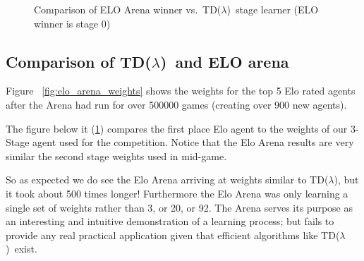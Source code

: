 \documentclass[11pt]{article}
\newcommand{\tdl}{TD($\lambda$)}
\begin{document}
\begin{figure}[htbp]
  \centering
  \caption{Comparison of ELO Arena winner vs.\ \tdl\ stage
    learner (ELO winner is stage 0)}
  \label{fig:elo_arena_comp}
\end{figure}

\clearpage

\subsection{Comparison of \tdl\ and ELO arena}
\label{sub:comparing_learning}

Figure ~\ref{fig:elo_arena_weights} shows the weights for the top 5 Elo rated agents
after the Arena had run for over 500000 games (creating over 900 new agents).

The figure below it (\ref{fig:elo_arena_comp}) compares the first place Elo agent
to the weights of our 3-Stage agent used for the competition. Notice that the 
Elo Arena results are very similar the second stage weights used in mid-game.

So as expected we do see the Elo Arena arriving at weights similar to \tdl, but
it took about 500 times longer! Furthermore the Elo Arena was only learning
a single set of weights rather than 3, or 20, or 92.
The Arena serves its purpose as an interesting and intuitive demonstration
of a learning process; but fails to provide any real practical application
given that efficient algorithms like \tdl\ exist.
\end{document}
